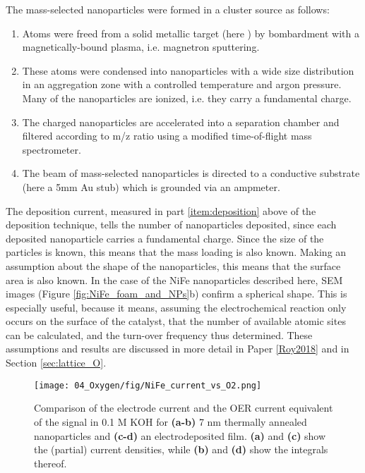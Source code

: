 The mass-selected nanoparticles were formed in a cluster source as follows\cite{VonIssendorff1999}: 
\begin{enumerate} 
	\item Atoms were freed from a solid metallic target (here ) by bombardment with a magnetically-bound plasma, i.e. magnetron sputtering. 
	
	\item These atoms were condensed into nanoparticles with a wide size distribution in an aggregation zone with a controlled temperature and argon pressure. Many of the nanoparticles are ionized, i.e. they carry a fundamental charge. 
	
	\item The charged nanoparticles are accelerated into a separation chamber and filtered according to m/z ratio using a modified time-of-flight mass spectrometer. 
	
	\item The beam of mass-selected nanoparticles is directed to a conductive substrate (here a 5mm Au stub) which is grounded via an ampmeter.  \label{item:deposition}
\end{enumerate}

The deposition current, measured in part \ref{item:deposition} above of the deposition technique, tells the number of nanoparticles deposited, since each deposited nanoparticle carries a fundamental charge. Since the size of the particles is known, this means that the mass loading is also known. Making an assumption about the shape of the nanoparticles, this means that the surface area is also known. In the case of the NiFe nanoparticles described here, SEM images (Figure \ref{fig:NiFe_foam_and_NPs}b) confirm a spherical shape. This is especially useful, because it means, assuming the electrochemical reaction only occurs on the surface of the catalyst, that the number of available atomic sites can be calculated, and the turn-over frequency thus determined. These assumptions and results are discussed in more detail in Paper \ref{Roy2018} and in Section \ref{sec:lattice_O}.


\begin{figure}[h]
	\centering
	\texttt{[image: 04\_Oxygen/fig/NiFe\_current\_vs\_O2.png]}
	\caption{Comparison of the electrode current and the OER current equivalent of the  signal in 0.1 M KOH for \textbf{(a-b)} 7 nm thermally annealed  nanoparticles and \textbf{(c-d)} an electrodeposited  film. \textbf{(a)} and \textbf{(c)} show the (partial) current densities, while \textbf{(b)} and \textbf{(d)} show the integrals thereof.}
	\label{fig:NiFe_current_vs_O2}
\end{figure}

